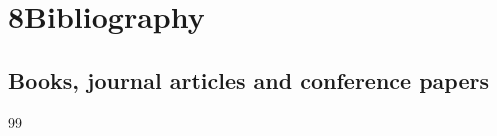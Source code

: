 \clearpage
\section*{8\quad Bibliography}
{\small
\renewcommand{\bibsection}{}
\subsection*{Books, journal articles and conference papers}
\begin{thebibliography}{99}


\end{thebibliography}}
